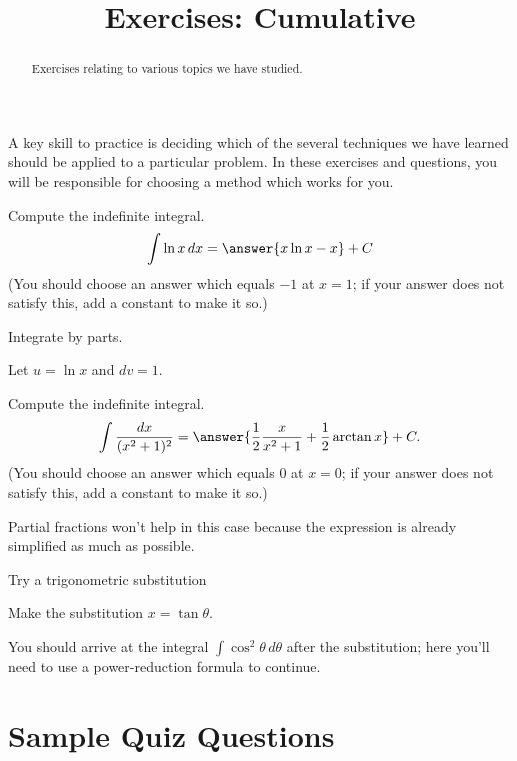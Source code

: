 \documentclass{ximera}
\title{Exercises: Cumulative}
\begin{document}
\begin{abstract}
Exercises relating to various topics we have studied.
\end{abstract}
\maketitle


A key skill to practice is deciding which of the several techniques we have learned should be applied to a particular problem. In these exercises and questions, you will be responsible for choosing a method which works for you.

\begin{exercise}
Compute the indefinite integral.
\[ \int \ln x \, dx = \answer{ x \ln x - x} + C\]
(You should choose an answer which equals $-1$ at $x = 1$; if your answer does not satisfy this, add a constant to make it so.)
\begin{hint}
Integrate by parts.
\end{hint}
\begin{hint}
Let $u = \ln x$ and $dv = 1$.
\end{hint}
\end{exercise}

\begin{exercise}
Compute the indefinite integral.
\[ \int \frac{dx}{(x^2+1)^2} = \answer{ \frac{1}{2} \frac{x}{x^2+1} + \frac{1}{2} \arctan x} + C.\]
(You should choose an answer which equals $0$ at $x = 0$; if your answer does not satisfy this, add a constant to make it so.)
\begin{hint}
Partial fractions won't help in this case because the expression is already simplified as much as possible.
\end{hint}
\begin{hint}
Try a trigonometric substitution
\end{hint}
\begin{hint}
Make the substitution $x = \tan \theta$.
\end{hint}
\begin{hint}
You should arrive at the integral $\int \cos^2 \theta \, d \theta$ after the substitution; here you'll need to use a power-reduction formula to continue.
\end{hint}
\end{exercise}

\section*{Sample Quiz Questions}
\end{document}

